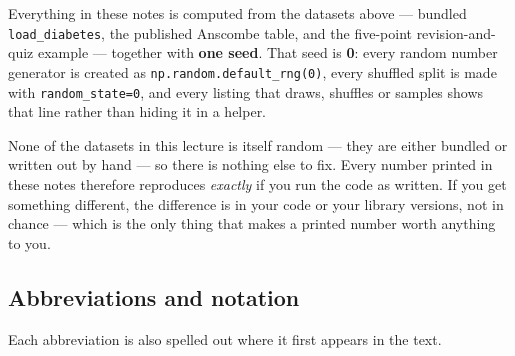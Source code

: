 \documentclass[11pt]{article}
\begin{document}
\begin{keyidea}
Everything in these notes is computed from the datasets above --- bundled
\texttt{load\_diabetes}, the published Anscombe table, and the five-point
revision-and-quiz example --- together with \textbf{one seed}. That seed is
\textbf{0}: every random number generator is created as
\texttt{np.random.default\_rng(0)}, every shuffled split is made with
\texttt{random\_state=0}, and every listing that draws, shuffles or samples
shows that line rather than hiding it in a helper.

None of the datasets in this lecture is itself random --- they are either
bundled or written out by hand --- so there is nothing else to fix. Every
number printed in these notes therefore reproduces \emph{exactly} if you run
the code as written. If you get something different, the difference is in your
code or your library versions, not in chance --- which is the only thing that
makes a printed number worth anything to you.
\end{keyidea}

\subsection{Abbreviations and notation}
\label{sec:abbrev}

Each abbreviation is also spelled out where it first appears in the text.
\end{document}
